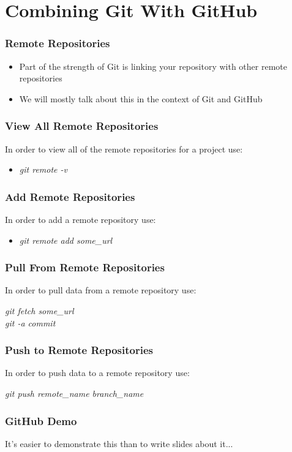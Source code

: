 
\section[GitHub]{Combining Git With GitHub}

\begin{frame}
\frametitle{Remote Repositories}
\begin{itemize}
\item Part of the strength of Git is linking your repository with other remote repositories
\item We will mostly talk about this in the context of Git and GitHub
\end{itemize}
\end{frame}
\note{}

\begin{frame}
\frametitle{View All Remote Repositories}
In order to view all of the remote repositories for a project use:
\begin{itemize}
\item \emph{git remote -v}
\end{itemize}
\end{frame}
\note{}

\begin{frame}
\frametitle{Add Remote Repositories}
In order to add a remote repository use:
\begin{itemize}
\item \emph{git remote add some\_url}
\end{itemize}
\end{frame}
\note{}

\begin{frame}
\frametitle{Pull From Remote Repositories}
In order to pull data from a remote repository use:
\begin{center}
\emph{git fetch some\_url}\\
\emph{git -a commit}
\end{center}
\end{frame}
\note{}

\begin{frame}
\frametitle{Push to Remote Repositories}
In order to push data to a remote repository use:
\begin{center}
\emph{git push remote\_name branch\_name}
\end{center}
\end{frame}
\note{}

\begin{frame}
\frametitle{GitHub Demo}
\begin{center}
It's easier to demonstrate this than to write slides about it...
\end{center}
\end{frame}
\note{}